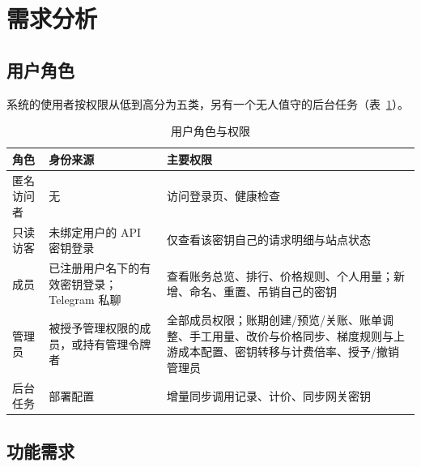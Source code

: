 \section{需求分析}

\subsection{用户角色}

系统的使用者按权限从低到高分为五类，另有一个无人值守的后台任务（表~\ref{tab:roles}）。

\begin{table}[H]
\centering\small
\caption{用户角色与权限}\label{tab:roles}
\begin{tabularx}{\textwidth}{@{}lXX@{}}
\toprule
角色 & 身份来源 & 主要权限 \\ \midrule
匿名访问者 & 无 & 访问登录页、健康检查 \\
只读访客 & 未绑定用户的 API 密钥登录 & 仅查看该密钥自己的请求明细与站点状态 \\
成员 & 已注册用户名下的有效密钥登录；Telegram 私聊 & 查看账务总览、排行、价格规则、个人用量；新增、命名、重置、吊销自己的密钥 \\
管理员 & 被授予管理权限的成员，或持有管理令牌者 & 全部成员权限；账期创建/预览/关账、账单调整、手工用量、改价与价格同步、梯度规则与上游成本配置、密钥转移与计费倍率、授予/撤销管理员 \\
后台任务 & 部署配置 & 增量同步调用记录、计价、同步网关密钥 \\
\bottomrule
\end{tabularx}
\end{table}

\subsection{功能需求}

